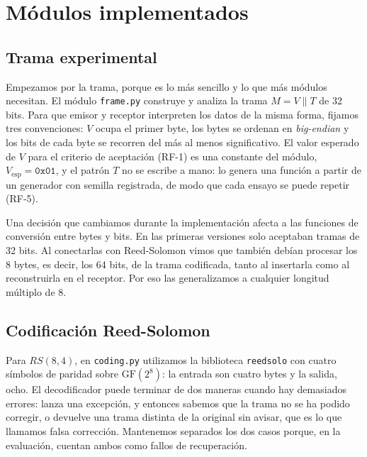 \documentclass[IB]{TFUOC}%
\begin{document}
\section{Módulos implementados}
\label{sec:modulos_implementados}

\subsection{Trama experimental}
\label{subsec:impl_frame}

Empezamos por la trama, porque es lo más sencillo y lo que más módulos necesitan. El módulo \texttt{frame.py} construye y analiza la trama $M=V\parallel T$ de 32 bits. Para que emisor y 
receptor interpreten los datos de la misma forma, fijamos tres convenciones: $V$ ocupa el primer byte, los bytes se ordenan en \textit{big-endian} y los bits de cada byte se recorren del más al menos significativo. El valor esperado de $V$ para el criterio de aceptación (RF-1) es una constante del módulo, $V_{\mathrm{esp}}=\texttt{0x01}$, y el patrón $T$ no se escribe a mano: lo genera una función a partir de un generador con semilla registrada, de modo que cada ensayo se puede repetir (RF-5).

Una decisión que cambiamos durante la implementación afecta a las funciones de conversión entre bytes y bits. 
En las primeras versiones solo aceptaban tramas de 32 bits. Al conectarlas con Reed-Solomon vimos que también debían procesar los 8 bytes, es decir, los 64 bits, de la trama codificada, tanto al insertarla como al reconstruirla en el receptor. Por eso las generalizamos a cualquier longitud múltiplo de 8.

\subsection{Codificación Reed-Solomon}
\label{subsec:impl_coding}

Para $RS(8,4)$, en \texttt{coding.py} utilizamos la biblioteca \texttt{reedsolo} con cuatro símbolos de paridad sobre $\mathrm{GF}(2^8)$: la entrada son cuatro bytes y la salida, ocho. El decodificador puede terminar de dos maneras cuando hay demasiados errores: lanza una excepción, y entonces sabemos que la trama no se ha podido corregir, o devuelve una trama distinta de la original sin avisar, que es lo que llamamos falsa corrección. Mantenemos separados los dos casos porque, en la evaluación, cuentan ambos como fallos de recuperación.
\end{document}
